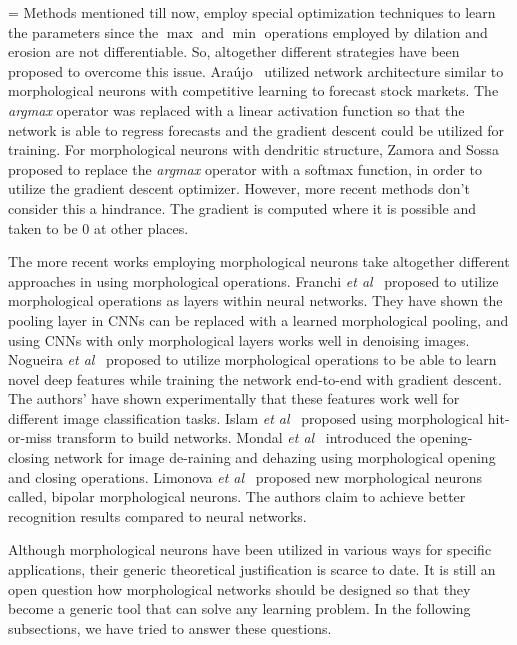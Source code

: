 \documentclass{bmvc2k}
\def\etal{\emph{et al}\bmvaOneDot}
\begin{document}
=
Methods mentioned till now, employ special optimization techniques to learn the parameters since the $\max$ and $\min$ operations employed by dilation and erosion are not differentiable. So, altogether different strategies have been proposed to overcome this issue. 
Ara\'{u}jo~\cite{de_a._araujo_morphological_2012} utilized network architecture similar to morphological neurons with competitive learning to forecast stock markets. The \emph{argmax} operator was replaced with a linear activation function so that the network is able to regress forecasts and the gradient descent could be utilized for training. 
For morphological neurons with dendritic structure, Zamora and Sossa~\cite{zamora_dendrite_2017} proposed to replace the \emph{argmax} operator with a softmax function, in order to utilize the gradient descent optimizer. However, more recent methods don't consider this a hindrance. The gradient is computed where it is possible and taken to be 0 at other places.


The more recent works employing morphological neurons take altogether different approaches in using morphological operations.
Franchi \etal{}~\cite{franchi2020deep} proposed to utilize morphological operations as layers within neural networks. They have shown the pooling layer in CNNs can be replaced with a learned morphological pooling, and using CNNs with only morphological layers works well in denoising images. 
Nogueira \etal{}~\cite{nogueira2019introduction} proposed to utilize morphological operations to be able to learn novel deep features while training the network end-to-end with gradient descent. The authors' have shown experimentally that these features work well for different image classification tasks. 
Islam \etal{}~\cite{aminul2019deep} proposed using morphological hit-or-miss transform to build networks. Mondal \etal{}~\cite{mondal2020image} introduced the opening-closing network for image de-raining and dehazing using morphological opening and closing operations. Limonova \etal{}~\cite{limonova2020bipolar} proposed new morphological neurons called, bipolar morphological neurons. The authors claim to achieve better recognition results compared to neural networks. 

Although morphological neurons have been utilized in various ways for specific applications, their generic theoretical justification is scarce to date. It is still an open question how morphological networks should be designed so that they become a generic tool that can solve any learning problem.
In the following subsections, we have tried to answer these questions. 
\end{document}
